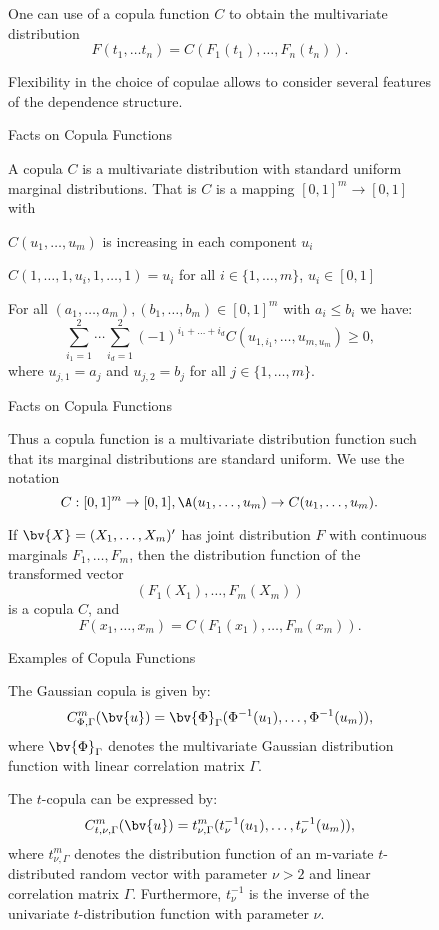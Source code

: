 \begin{figure}[htp]
One can use of a copula function $C$ to obtain the multivariate distribution
$$
F(t_{1},\ldots t_{n})=C(F_{1}(t_{1}),\ldots,F_{n}(t_{n})).
$$


Flexibility in the choice of copulae allows to consider several features
of the dependence structure.



 Facts on Copula Functions

A copula $C$ is a multivariate distribution with standard uniform
marginal distributions. That is $C$ is a mapping $[0,1]^{m}\rightarrow[0,1]$
with 

 $C(u_{1},\ldots,u_{m})$ is increasing in each component $u_{i}$ 

 $C(1,\ldots,1,u_{i},1,\ldots,1)=u_{i}$ for all $i\in\{1,\ldots,m\}$,
$u_{i}\in[0,1]$ 

 For all $(a_{1},\ldots,a_{m}),(b_{1},\ldots,b_{m})\in[0,1]^{m}$
with $a_{i}\leq b_{i}$ we have: 
$$
\sum_{i_{1}=1}^{2}\cdots\sum_{i_{d}=1}^{2}(-1)^{i_{1}+\ldots+i_{d}}C(u_{1,i_{1}},\ldots,u_{m,u_{m}})\geq0,
$$
where $u_{j,1}=a_{j}$ and $u_{j,2}=b_{j}$ for all $j\in\{1,\ldots,m\}$. 



 Facts on Copula Functions

Thus a copula function is a multivariate distribution function such
that its marginal distributions are standard uniform. We use the notation
$$
C:[0,1]^{m}\rightarrow[0,1],\A(u_{1},\ldots,u_{m})\rightarrow C(u_{1},\ldots,u_{m}).
$$


If $\bv{X}=(X_{1},\ldots,X_{m})'$ has joint distribution $F$ with
continuous marginals $F_{1},\ldots,F_{m}$, then the distribution
function of the transformed vector 
$$
(F_{1}(X_{1}),\ldots,F_{m}(X_{m}))
$$
is a copula $C$, and 
$$
F(x_{1},\ldots,x_{m})=C(F_{1}(x_{1}),\ldots,F_{m}(x_{m})).
$$




 Examples of Copula Functions

The Gaussian copula is given by: 
$$
C_{\Phi,\Gamma}^{m}(\bv{u})=\bv{\Phi}_{\Gamma}(\Phi^{-1}(u_{1}),\ldots,\Phi^{-1}(u_{m})),
$$
where $\bv{\Phi}_{\Gamma}$ denotes the multivariate Gaussian distribution
function with linear correlation matrix $\Gamma$.

The $t$-copula can be expressed by: 
$$
C_{t,\nu,\Gamma}^{m}(\bv{u})=t_{\nu,\Gamma}^{m}(t_{\nu}^{-1}(u_{1}),\ldots,t_{\nu}^{-1}(u_{m})),
$$
where $t_{\nu,\Gamma}^{m}$ denotes the distribution function of an
m-variate $t$-distributed random vector with parameter $\nu>2$ and
linear correlation matrix $\Gamma$. Furthermore, $t_{\nu}^{-1}$
is the inverse of the univariate $t$-distribution function with parameter
$\nu$.




\end{figure}

